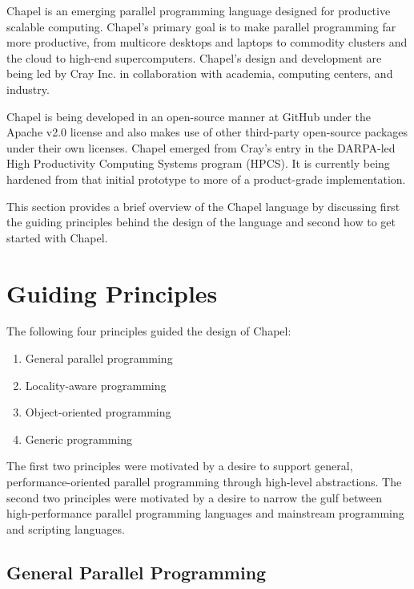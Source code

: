 \label{Language_Overview}

Chapel is an emerging parallel programming language designed for
productive scalable computing. Chapel's primary goal is to make
parallel programming far more productive, from multicore desktops and
laptops to commodity clusters and the cloud to high-end
supercomputers. Chapel's design and development are being led by Cray
Inc. in collaboration with academia, computing centers, and industry.

Chapel is being developed in an open-source manner at GitHub under the
Apache v2.0 license and also makes use of other third-party
open-source packages under their own licenses. Chapel emerged from
Cray's entry in the DARPA-led High Productivity Computing Systems
program (HPCS). It is currently being hardened from that initial
prototype to more of a product-grade implementation.

This section provides a brief overview of the Chapel language by
discussing first the guiding principles behind the design of the
language and second how to get started with Chapel.

\section{Guiding Principles}
\label{Guiding_Principles}

The following four principles guided the design of Chapel:
\begin{enumerate}
\item General parallel programming
\item Locality-aware programming
\item Object-oriented programming
\item Generic programming
\end{enumerate}
The first two principles were motivated by a desire to support
general, performance-oriented parallel programming through high-level
abstractions.  The second two principles were motivated by a desire to
narrow the gulf between high-performance parallel programming
languages and mainstream programming and scripting languages.

\subsection{General Parallel Programming}
\label{General_Parallel_Programming}

